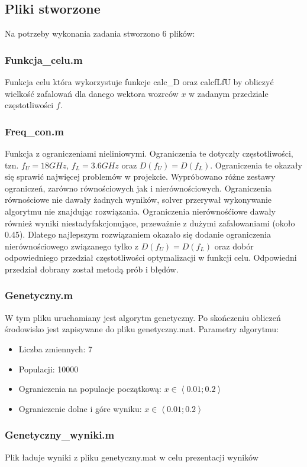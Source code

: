 \documentclass[10pt,a4paper]{article}
\begin{document}
\subsection{Pliki stworzone}
Na potrzeby wykonania zadania stworzono 6 plików:

\subsubsection{Funkcja\_celu.m}
Funkcja celu która wykorzystuje funkcje calc\_D oraz calcfLfU by obliczyć wielkość zafalowań dla
danego wektora wozrców $x$ w zadanym przedziale częstotliwości $f$.

\subsubsection{Freq\_con.m}
Funkcja z ograniczeniami nieliniowymi. Ograniczenia te dotyczły częstotliwości, tzn.
 $f_U=18GHz$, $f_L=3.6GHz$ oraz $D(f_U)=D(f_L)$.
Ograniczenia te okazały się sprawić najwięcej problemów w projekcie.
Wypróbowano różne zestawy ograniczeń, zarówno równościowych jak i nierównościowych.
Ograniczenia równościowe nie dawały żadnych wyników,
solver przerywał wykonywanie algorytmu nie znajdując rozwiązania.
Ograniczenia nierównośćiowe dawały również wyniki niestadyfakcjonujące,
przeważnie z dużymi zafalowaniami (około 0.45).
Dlatego najlepszym rozwiązaniem okazało się dodanie ograniczenia nierównościowego związanego tylko z $D(f_U)=D(f_L)$ oraz dobór odpowiedniego przedział częstotliwości optymalizacji w funkcji celu.
Odpowiedni przedział dobrany został metodą prób i błędów.

\subsubsection{Genetyczny.m}
W tym pliku uruchamiany jest algorytm genetyczny.
Po skończeniu obliczeń środowisko jest zapisywane do pliku genetyczny.mat.
Parametry algorytmu:
\begin{itemize}
\item Liczba zmiennych: 7
\item Populacji: 10000
\item Ograniczenia na populacje początkową: $x \in \left\langle 0.01;0.2 \right\rangle$
\item Ograniczenie dolne i góre wyniku: $x \in \left\langle 0.01;0.2 \right\rangle$
\end{itemize}
\subsubsection{Genetyczny\_wyniki.m}
Plik ładuje wyniki z pliku genetyczny.mat w celu prezentacji wyników
\end{document}
